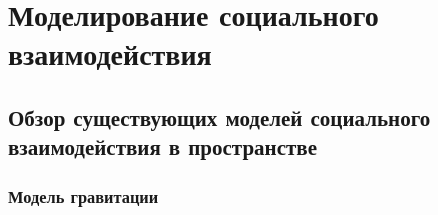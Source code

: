 \chapter{Моделирование социального взаимодействия}\label{ch:ch2}

\section{Обзор существующих моделей социального взаимодействия в пространстве}\label{sec:ch2/sec1}

\subsection*{Модель гравитации}


\FloatBarrier
